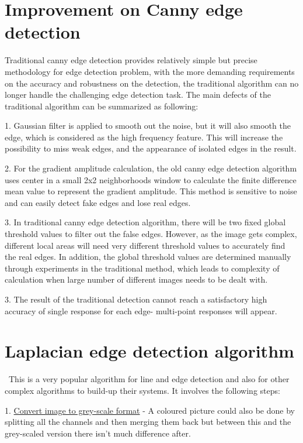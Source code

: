 \documentclass[BTech]{srmuthesis}
\begin{document}
\section{Improvement on Canny edge detection}
Traditional canny edge detection provides relatively simple but precise methodology for edge detection problem, with the more demanding requirements on the accuracy and robustness on the detection, the traditional algorithm can no longer handle the challenging edge detection task. The main defects of the traditional algorithm can be summarized as following:

1. Gaussian filter is applied to smooth out the noise, but it will also smooth the edge, which is considered as the high frequency feature. This will increase the possibility to miss weak edges, and the appearance of isolated edges in the result.

2. For the gradient amplitude calculation, the old canny edge detection algorithm uses center in a small 2x2 neighborhoods window to calculate the finite difference mean value to represent the gradient amplitude. This method is sensitive to noise and can easily detect fake edges and lose real edges.

3. In traditional canny edge detection algorithm, there will be two fixed global threshold values to filter out the false edges. However, as the image gets complex, different local areas will need very different threshold values to accurately find the real edges. In addition, the global threshold values are determined manually through experiments in the traditional method, which leads to complexity of calculation when large number of different images needs to be dealt with.

3. The result of the traditional detection cannot reach a satisfactory high accuracy of single response for each edge- multi-point responses will appear.



\section{Laplacian edge detection algorithm}
\ This is a very popular
algorithm for line and edge detection and also for
other complex algorithms to build-up their systems.
It involves the following steps:

1. \underline{Convert image to grey-scale format} - A coloured picture could also be done by splitting all the
channels and then merging them back but between this and the grey-scaled version there isn't much difference after.
\end{document}
